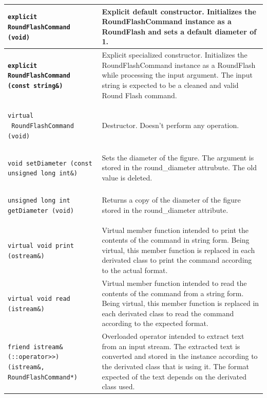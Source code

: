 \documentclass[11pt,twoside,openany,x11names,svgnames]{memoir}
\begin{document}
\begin{table}[h]\footnotesize
\centering
\begin{tabular}{| >{\bfseries}p{10.5cm} | p{5cm} |}
	\hline
	
	\texttt{explicit RoundFlashCommand (void)} & Explicit default constructor. Initializes the RoundFlashCommand instance as a RoundFlash and sets a default diameter of 1. \\
	
	\hline
	
	\texttt{explicit RoundFlashCommand (const string\&)} & Explicit specialized constructor. Initializes the RoundFlashCommand instance as a RoundFlash while processing the input argument. The input string is expected to be a cleaned and valid Round Flash command. \\
	
	\hline
	
	\texttt{virtual ~RoundFlashCommand (void)} & Destructor. Doesn't perform any operation. \\
	
	\hline
	
	\texttt{void setDiameter (const unsigned long int\&)} & Sets the diameter of the figure. The argument is stored in the round\_diameter attrubute. The old value is deleted. \\
	
	\hline	
	
	\texttt{unsigned long int getDiameter (void)} & Returns a copy of the diameter of the figure stored in the round\_diameter attribute. \\
		
	\hline
	
	\texttt{virtual void print (ostream\&)} & Virtual member function intended to print the contents of the command in string form. Being virtual, this member function is replaced in each derivated class to print the command according to the actual format. \\
	
	\hline
	
	\texttt{virtual void read (istream\&)} & Virtual member function intended to read the contents of the command from a string form. Being virtual, this member function is replaced in each derivated class to read the command according to the expected format. \\
	
	\hline	
		
	\texttt{friend istream\& (::operator>>) (istream\&, RoundFlashCommand*)} & Overloaded operator intended to extract text from an input stream. The extracted text is converted and stored in the instance according to the derivated class that is using it. The format expected of the text depends on the derivated class used. \\
	

\end{tabular}
\end{table}
\end{document}
